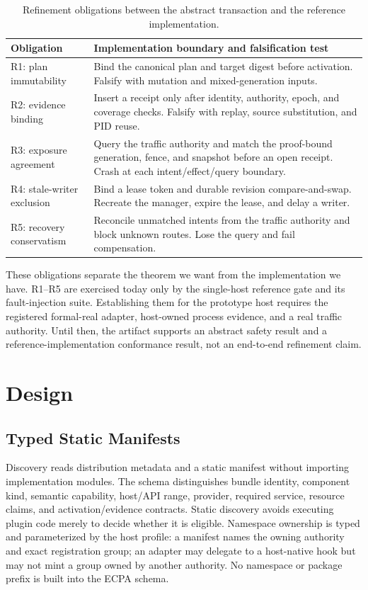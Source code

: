 \documentclass[letterpaper,twocolumn,10pt]{article}
\begin{document}
\begin{table}[t]
\centering\small
\caption{Refinement obligations between the abstract transaction and the
reference implementation.}
\label{tab:refinement}
\begin{tabularx}{\columnwidth}{@{}lX@{}}
\toprule
Obligation & Implementation boundary and falsification test \\
\midrule
R1: plan immutability & Bind the canonical plan and target digest before
activation.  Falsify with mutation and mixed-generation inputs. \\
R2: evidence binding & Insert a receipt only after identity, authority, epoch,
and coverage checks.  Falsify with replay, source substitution, and PID reuse. \\
R3: exposure agreement & Query the traffic authority and match the proof-bound
generation, fence, and snapshot before an open receipt.  Crash at each
intent/effect/query boundary. \\
R4: stale-writer exclusion & Bind a lease token and durable revision
compare-and-swap.  Recreate the manager, expire the lease, and delay a writer. \\
R5: recovery conservatism & Reconcile unmatched intents from the traffic
authority and block unknown routes.  Lose the query and fail compensation. \\
\bottomrule
\end{tabularx}
\end{table}

These obligations separate the theorem we want from the implementation we
have.  R1--R5 are exercised today only by the single-host reference gate and
its fault-injection suite.  Establishing them for the prototype host requires the
registered formal-real adapter, host-owned process evidence, and a real traffic
authority.  Until then, the artifact supports an abstract safety result and a
reference-implementation conformance result, not an end-to-end refinement
claim.

\section{Design}
\subsection{Typed Static Manifests}
Discovery reads distribution metadata and a static manifest without importing
implementation modules.  The schema distinguishes bundle identity, component
kind, semantic capability, host/API range, provider, required service, resource
claims, and activation/evidence contracts.  Static discovery avoids executing
plugin code merely to decide whether it is eligible.  Namespace ownership is
typed and parameterized by the host profile: a manifest names the owning
authority and exact registration group; an adapter may delegate to a
host-native hook but may not mint a group owned by another authority.  No
namespace or package prefix is built into the ECPA schema.
\end{document}
